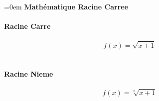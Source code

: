 \documentclass{article}
\begin{document}
\parindent=0em
\textbf{Mathématique Racine Carree} \\ \\
\textbf{Racine Carre} \\ \\
$$f(x)=\sqrt{x+1}$$ \\ \\
\textbf{Racine Nieme} \\ \\
$$f(x)=\sqrt[n]{x+1}$$ \\ \\
\end{document}
